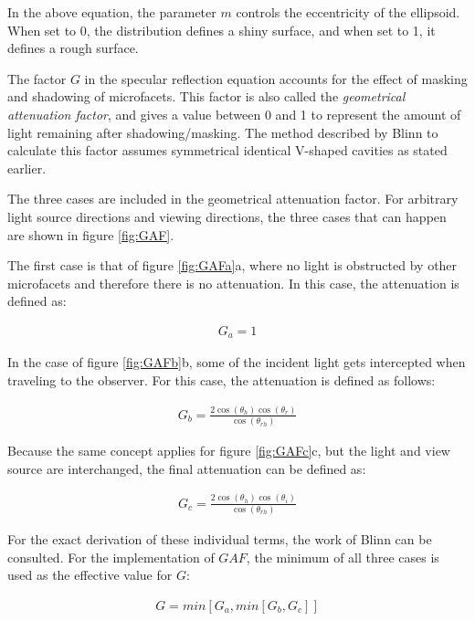In the above equation, the parameter $m$ controls the eccentricity of the ellipsoid. When set to 0, the distribution defines a shiny surface, and when set to 1, it defines a rough surface.

The factor $G$ in the specular reflection equation accounts for the effect of masking and shadowing of microfacets. This factor is also called the \textit{geometrical attenuation factor}, and gives a value between 0 and 1 to represent the amount of light remaining after shadowing/masking. The method described by Blinn to calculate this factor assumes symmetrical identical V-shaped cavities as stated earlier. 

The three cases are included in the geometrical attenuation factor. For arbitrary light source directions and viewing directions, the three cases that can happen are shown in figure \ref{fig:GAF}.

The first case is that of figure \ref{fig:GAFa}a, where no light is obstructed by other microfacets and therefore there is no attenuation. In this case, the attenuation is defined as:

	\begin{eqnarray*}
		G_a = 1
	\end{eqnarray*}

In the case of figure \ref{fig:GAFb}b, some of the incident light gets intercepted when traveling to the observer. For this case, the attenuation is defined as follows:

	\begin{eqnarray*}
		G_b = \frac{2\cos(\theta_h)\cos(\theta_r)}{\cos(\theta_{rh})}
	\end{eqnarray*}

Because the same concept applies for figure \ref{fig:GAFc}c, but the light and view source are interchanged, the final attenuation can be defined as:

	\begin{eqnarray*}
		G_c = \frac{2\cos(\theta_h)\cos(\theta_i)}{\cos(\theta_{rh})}
	\end{eqnarray*}

For the exact derivation of these individual terms, the work of Blinn \cite{Blinn} can be consulted. For the implementation of $GAF$, the minimum of all three cases is used as the effective value for $G$:

	\begin{eqnarray*}
		G = min \left[ {G_a, min \left[ {G_b, G_c} \right] } \right]
	\end{eqnarray*}

